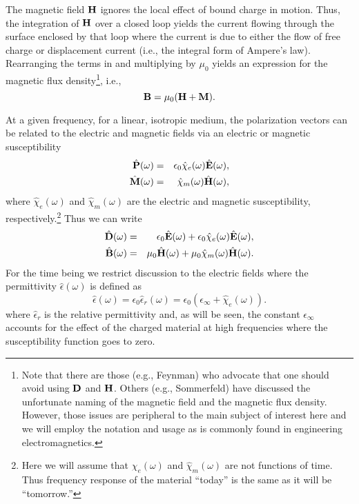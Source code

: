The magnetic field $\mathbf{H}$ ignores the local effect of bound charge in
motion.  Thus, the integration of $\mathbf{H}$ over a closed loop yields
the current flowing through the surface enclosed by that loop where
the current is due to either the flow of free charge or displacement
current (i.e., the integral form of Ampere's law).  Rearranging the
terms in  and multiplying by $\mu_0$ yields an
expression for the magnetic flux density\footnote{Note that there are
  those (e.g., Feynman) who advocate that one should avoid using
  $\mathbf{D}$ and $\mathbf{H}$.  Others (e.g., Sommerfeld) have discussed the
  unfortunate naming of the magnetic field and the magnetic flux
  density.  However, those issues are peripheral to the main subject
  of interest here and we will employ the notation and usage as is
  commonly found in engineering electromagnetics.}, i.e.,
\begin{equation}
  \mathbf{B} = \mu_0(\mathbf{H} + \mathbf{M}).
\end{equation}

At a given frequency, for a linear, isotropic medium, the polarization
vectors can be related to the electric and magnetic fields via an
electric or magnetic susceptibility
\begin{eqnarray}
  \hat{\mathbf{P}}(\omega) &=&
        \epsilon_0\hat{\chi}_e(\omega)\hat{\mathbf{E}}(\omega), \\
  \hat{\mathbf{M}}(\omega) &=&
        \hat{\chi}_m(\omega)\hat{\mathbf{H}}(\omega),
\end{eqnarray}
where $\hat{\chi}_e(\omega)$ and $\hat{\chi}_m(\omega)$ are the
electric and magnetic susceptibility, respectively.\footnote{Here we
  will assume that $\hat{\chi}_e(\omega)$ and $\hat{\chi}_m(\omega)$
  are not functions of time.  Thus frequency response of the material
  ``today'' is the same as it will be ``tomorrow.''}  Thus we can
write
\begin{eqnarray}
  \hat{\mathbf{D}}(\omega) &=& \epsilon_0\hat{\mathbf{E}}(\omega)
        	+ \epsilon_0\hat{\chi}_e(\omega)\hat{\mathbf{E}}(\omega), 
  \label{eq:dispersiveD} \\ 
  \hat{\mathbf{B}}(\omega) &=&\mu_0\hat{\mathbf{H}}(\omega)
	 + \mu_0\hat{\chi}_m(\omega)\hat{\mathbf{H}}(\omega). 
  \label{eq:dispersiveB}
\end{eqnarray}
For the time being we restrict discussion to the electric fields where
the permittivity $\hat{\epsilon}(\omega)$ is defined as
\begin{equation}
 \hat{\epsilon}(\omega) = \epsilon_0\hat{\epsilon}_r(\omega) =
     \epsilon_0(\epsilon_\infty + \hat{\chi}_e(\omega)).
\end{equation}
where $\hat{\epsilon}_r$ is the relative permittivity and, as will be
seen, the constant $\epsilon_\infty$ accounts for the effect of the
charged material at high frequencies where the susceptibility
function goes to zero.

